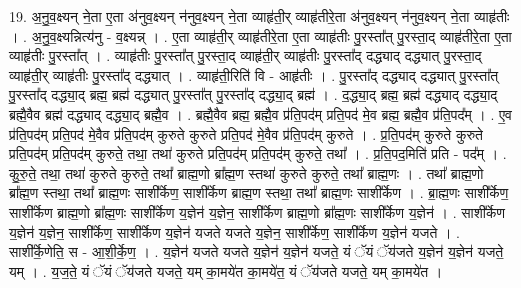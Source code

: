 \documentclass[17pt]{extarticle}
\begin{document}
19. अ॒नु॒व॒क्ष्यन् ने॒ता ए॒ता अ॑नुव॒क्ष्यन् न॑नुव॒क्ष्यन् ने॒ता व्याहृ॑ती॒र् व्याहृ॑तीरे॒ता अ॑नुव॒क्ष्यन् न॑नुव॒क्ष्यन् ने॒ता व्याहृ॑तीः । . अ॒नु॒व॒क्ष्यन्नित्य॑नु - व॒क्ष्यन्न् । . ए॒ता व्याहृ॑ती॒र् व्याहृ॑तीरे॒ता ए॒ता व्याहृ॑तीः पु॒रस्ता᳚त् पु॒रस्ता॒द् व्याहृ॑तीरे॒ता ए॒ता व्याहृ॑तीः पु॒रस्ता᳚त् । . व्याहृ॑तीः पु॒रस्ता᳚त् पु॒रस्ता॒द् व्याहृ॑ती॒र् व्याहृ॑तीः पु॒रस्ता᳚द् दद्ध्याद् दद्ध्यात् पु॒रस्ता॒द् व्याहृ॑ती॒र् व्याहृ॑तीः पु॒रस्ता᳚द् दद्ध्यात् । . व्याहृ॑ती॒रिति॑ वि - आहृ॑तीः । . पु॒रस्ता᳚द् दद्ध्याद् दद्ध्यात् पु॒रस्ता᳚त् पु॒रस्ता᳚द् दद्ध्या॒द् ब्रह्म॒ ब्रह्म॑ दद्ध्यात् पु॒रस्ता᳚त् पु॒रस्ता᳚द् दद्ध्या॒द् ब्रह्म॑ । . द॒द्ध्या॒द् ब्रह्म॒ ब्रह्म॑ दद्ध्याद् दद्ध्या॒द् ब्रह्मै॒वैव ब्रह्म॑ दद्ध्याद् दद्ध्या॒द् ब्रह्मै॒व । . ब्रह्मै॒वैव ब्रह्म॒ ब्रह्मै॒व प्र॑ति॒पद॑म् प्रति॒पद॑ मे॒व ब्रह्म॒ ब्रह्मै॒व प्र॑ति॒पद᳚म् । . ए॒व प्र॑ति॒पद॑म् प्रति॒पद॑ मे॒वैव प्र॑ति॒पद॑म् कुरुते कुरुते प्रति॒पद॑ मे॒वैव प्र॑ति॒पद॑म् कुरुते । . प्र॒ति॒पद॑म् कुरुते कुरुते प्रति॒पद॑म् प्रति॒पद॑म् कुरुते॒ तथा॒ तथा॑ कुरुते प्रति॒पद॑म् प्रति॒पद॑म् कुरुते॒ तथा᳚ । . प्र॒ति॒पद॒मिति॑ प्रति - पद᳚म् । . कु॒रु॒ते॒ तथा॒ तथा॑ कुरुते कुरुते॒ तथा᳚ ब्राह्म॒णो ब्रा᳚ह्म॒ण स्तथा॑ कुरुते कुरुते॒ तथा᳚ ब्राह्म॒णः । . तथा᳚ ब्राह्म॒णो ब्रा᳚ह्म॒ण स्तथा॒ तथा᳚ ब्राह्म॒णः साशी᳚र्केण॒ साशी᳚र्केण ब्राह्म॒ण स्तथा॒ तथा᳚ ब्राह्म॒णः साशी᳚र्केण । . ब्रा॒ह्म॒णः साशी᳚र्केण॒ साशी᳚र्केण ब्राह्म॒णो ब्रा᳚ह्म॒णः साशी᳚र्केण य॒ज्ञेन॑ य॒ज्ञेन॒ साशी᳚र्केण 
ब्राह्म॒णो ब्रा᳚ह्म॒णः साशी᳚र्केण य॒ज्ञेन॑ । . साशी᳚र्केण य॒ज्ञेन॑ य॒ज्ञेन॒ साशी᳚र्केण॒ साशी᳚र्केण य॒ज्ञेन॑ यजते यजते य॒ज्ञेन॒ साशी᳚र्केण॒ साशी᳚र्केण य॒ज्ञेन॑ यजते । . साशी᳚र्के॒णेति॒ स - आ॒शी॒र्के॒ण॒ । . य॒ज्ञेन॑ यजते यजते य॒ज्ञेन॑ य॒ज्ञेन॑ यजते॒ यं ॅयं ॅय॑जते य॒ज्ञेन॑ य॒ज्ञेन॑ यजते॒ यम् । . य॒ज॒ते॒ यं ॅयं ॅय॑जते यजते॒ यम् का॒मये॑त का॒मये॑त॒ यं ॅय॑जते यजते॒ यम् का॒मये॑त । \newline
\end{document}
